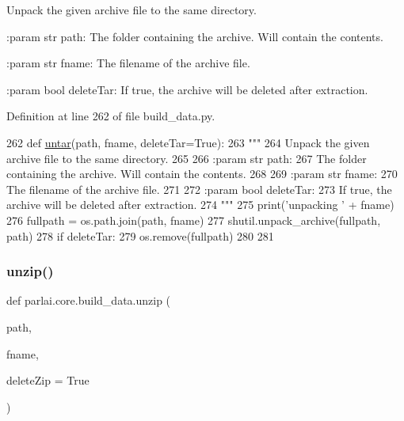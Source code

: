 \begin{DoxyVerb}Unpack the given archive file to the same directory.

:param str path:
    The folder containing the archive. Will contain the contents.

:param str fname:
    The filename of the archive file.

:param bool deleteTar:
    If true, the archive will be deleted after extraction.
\end{DoxyVerb}
 

Definition at line 262 of file build\+\_\+data.\+py.


\begin{DoxyCode}
262 \textcolor{keyword}{def }\hyperlink{namespaceparlai_1_1core_1_1build__data_a4d33f97932682a8513904022d852f3cf}{untar}(path, fname, deleteTar=True):
263     \textcolor{stringliteral}{"""}
264 \textcolor{stringliteral}{    Unpack the given archive file to the same directory.}
265 \textcolor{stringliteral}{}
266 \textcolor{stringliteral}{    :param str path:}
267 \textcolor{stringliteral}{        The folder containing the archive. Will contain the contents.}
268 \textcolor{stringliteral}{}
269 \textcolor{stringliteral}{    :param str fname:}
270 \textcolor{stringliteral}{        The filename of the archive file.}
271 \textcolor{stringliteral}{}
272 \textcolor{stringliteral}{    :param bool deleteTar:}
273 \textcolor{stringliteral}{        If true, the archive will be deleted after extraction.}
274 \textcolor{stringliteral}{    """}
275     print(\textcolor{stringliteral}{'unpacking '} + fname)
276     fullpath = os.path.join(path, fname)
277     shutil.unpack\_archive(fullpath, path)
278     \textcolor{keywordflow}{if} deleteTar:
279         os.remove(fullpath)
280 
281 
\end{DoxyCode}
\mbox{\label{namespaceparlai_1_1core_1_1build__data_a7cbfdf246ca40dc3ed9f8613deb14a00}} 
\subsubsection{\texorpdfstring{unzip()}{unzip()}}
{\footnotesize\ttfamily def parlai.\+core.\+build\+\_\+data.\+unzip (\begin{DoxyParamCaption}\item[{}]{path,  }\item[{}]{fname,  }\item[{}]{delete\+Zip = {\ttfamily True} }\end{DoxyParamCaption})}

